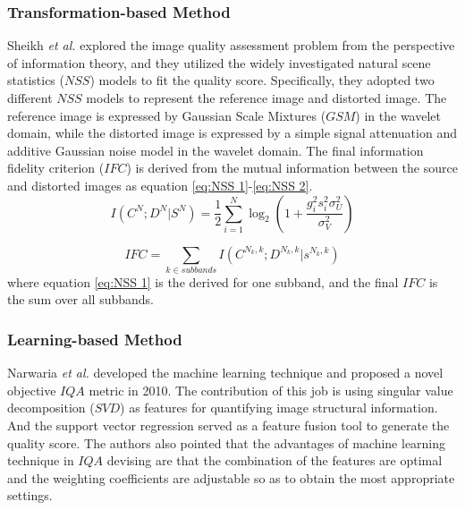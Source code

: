 \documentclass[journal]{IEEEtran}
\begin{document}
\subsubsection{Transformation-based Method}
Sheikh \textit{et al.} \cite{ilg2017flownet} explored the image quality assessment problem from the perspective of information theory, and they utilized the widely investigated natural scene statistics ($NSS$) models to fit the quality score. Specifically, they adopted two different $NSS$ models to represent the reference image and distorted image. The reference image is expressed by Gaussian Scale Mixtures ($GSM$) in the wavelet domain, while the distorted image is expressed by a simple signal attenuation and additive Gaussian noise model in the wavelet domain. The final information fidelity criterion ($IFC$) is derived from the mutual information between the source and distorted images as equation \ref{eq:NSS 1}-\ref{eq:NSS 2}.
\begin{equation}
I(C^N; D^N | S^N) = \frac{1}{2} \sum\limits_{i=1}^{N}\log_2(1+\frac{g_i^2 s_i^2 \sigma_U^2}{\sigma_V^2})
\label{eq:NSS 1}
\end{equation}

\begin{equation}
IFC = \sum_{k \in subbands}I(C^{N_k,k};D^{N_k,k}|s^{N_k,k})
\label{eq:NSS 2}
\end{equation}
where equation \ref{eq:NSS 1} is the derived for one subband, and the final $IFC$ is the sum over all subbands.



\subsubsection{Learning-based Method}
Narwaria \textit{et al.} \cite{lotter2016deep} developed the machine learning technique and proposed a novel objective $IQA$ metric in 2010. The contribution of this job is using singular value decomposition ($SVD$) as features for quantifying image structural information. And the support vector regression served as a feature fusion tool to generate the quality score. The authors also pointed that the advantages of machine learning technique in $IQA$ devising are that the combination of the features are optimal and the weighting coefficients are adjustable so as to obtain the most appropriate settings.
\end{document}
